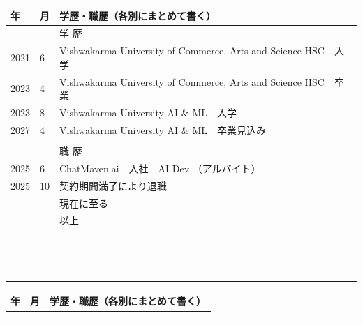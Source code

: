 \documentclass[9pt,a4paper]{article}
\begin{document}
\noindent
\begin{tabularx}{\textwidth}{|p{16mm}|p{10mm}|X|}
\hline
\centering 年 & \centering 月 & \centering 学歴・職歴（各別にまとめて書く） \tabularnewline \hline
& & \centering 学 歴 \tabularnewline
2021 & 6  & Vishwakarma University of Commerce, Arts and Science HSC　入学 \\
2023 & 4  & Vishwakarma University of Commerce, Arts and Science HSC　卒業 \\
2023 & 8  & Vishwakarma University AI \& ML　入学 \\
2027 & 4  & Vishwakarma University AI \& ML　卒業見込み \\
& & \\
& & \centering 職 歴 \tabularnewline
2025 & 6  & ChatMaven.ai　入社　AI Dev （アルバイト） \\
2025 & 10 & 契約期間満了により退職 \\
& & \hfill 現在に至る \tabularnewline
& & \hfill 以上 \tabularnewline
\hline \rule{0pt}{14pt} & & \\
\hline \rule{0pt}{14pt} & & \\
\hline \rule{0pt}{14pt} & & \\
\hline \rule{0pt}{14pt} & & \\
\hline \rule{0pt}{14pt} & & \\
\hline \rule{0pt}{14pt} & & \\
\hline \rule{0pt}{14pt} & & \\
\hline \rule{0pt}{14pt} & & \\
\hline \rule{0pt}{14pt} & & \\
\hline \rule{0pt}{14pt} & & \\
\hline \rule{0pt}{14pt} & & \\
\hline \rule{0pt}{14pt} & & \\
\hline \rule{0pt}{14pt} & & \\
\hline \rule{0pt}{14pt} & & \\
\hline
\end{tabularx}

\newpage

\noindent
\begin{tabularx}{\textwidth}{|p{16mm}|p{10mm}|X|}
\hline
\centering 年 & \centering 月 & \centering 学歴・職歴（各別にまとめて書く） \tabularnewline \hline
\rule{0pt}{14pt} & & \\
\rule{0pt}{14pt} & & \\
\hline
\end{tabularx}
\vspace*{-0.5pt}
\end{document}
